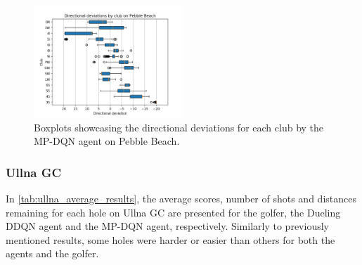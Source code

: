 \documentclass{kththesis}
\begin{document}
\begin{figure}
    \centering
    \includegraphics[width=0.5\textwidth]{Boxplots/MPDQN_Pebble_directions.png}
    \caption{Boxplots showcasing the directional deviations for each club by the MP-DQN agent on Pebble Beach.}
    \label{fig:MPDQN_pebble_direction_choices}
\end{figure}

\subsubsection{Ullna GC}
In \autoref{tab:ullna_average_results}, the average scores, number of shots and distances remaining for each hole on Ullna GC are presented for the golfer, the Dueling DDQN agent and the MP-DQN agent, respectively. Similarly to previously mentioned results, some holes were harder or easier than others for both the agents and the golfer. 
\end{document}
